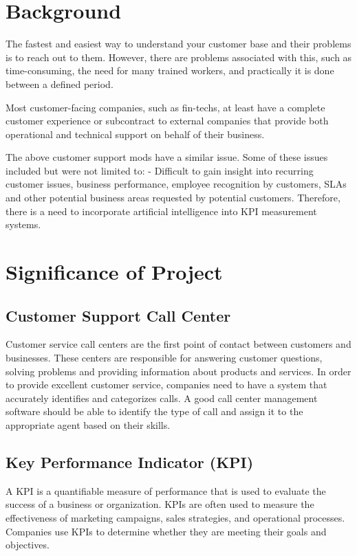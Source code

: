 \documentclass[conference]{IEEEtran}
\begin{document}
\section{Background}
The fastest and easiest way to understand your customer base and their problems is to reach out to them. However, there are problems associated with this, such as time-consuming, the need for many trained workers, and practically it is done between a defined period.

Most customer-facing companies, such as fin-techs, at least have a complete customer experience or subcontract to external companies that provide both operational and technical support on behalf of their business.

The above customer support mods have a similar issue. Some of these issues included but were not limited to: - Difficult to gain insight into recurring customer issues, business performance, employee recognition by customers, SLAs and other potential business areas requested by potential customers. Therefore, there is a need to incorporate artificial intelligence into KPI measurement systems.

\section{Significance of Project}

\subsection{Customer Support Call Center}
Customer service call centers are the first point of contact between customers and businesses. These centers are responsible for answering customer questions, solving problems and providing information about products and services. In order to provide excellent customer service, companies need to have a system that accurately identifies and categorizes calls. A good call center management software should be able to identify the type of call and assign it to the appropriate agent based on their skills.

\subsection{Key Performance Indicator (KPI)}
A KPI is a quantifiable measure of performance that is used to evaluate the success of a business or organization. KPIs are often used to measure the effectiveness of marketing campaigns, sales strategies, and operational processes. Companies use KPIs to determine whether they are meeting their goals and objectives.
\end{document}
